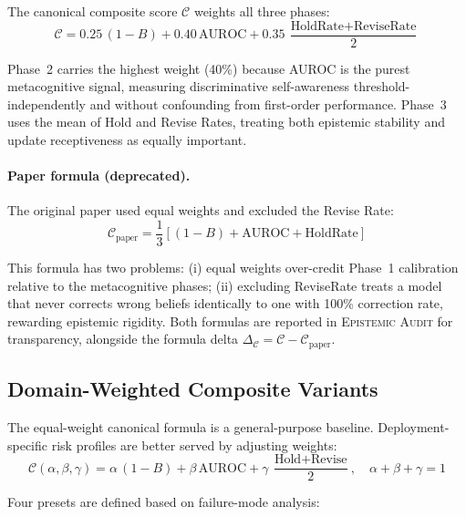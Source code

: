 \documentclass[12pt,a4paper]{article}
\newcommand{\EAv}{\textsc{Epistemic Audit}}
\begin{document}
The canonical composite score $\mathcal{C}$ weights all three phases:
\begin{equation}
    \mathcal{C} = 0.25\,(1 - B) + 0.40\,\text{AUROC} + 0.35\,\frac{\text{HoldRate} + \text{ReviseRate}}{2}
    \label{eq:composite_canonical}
\end{equation}

Phase~2 carries the highest weight (40\%) because AUROC is the purest metacognitive signal,
measuring discriminative self-awareness threshold-independently and without confounding from
first-order performance. Phase~3 uses the mean of Hold and Revise Rates, treating both
epistemic stability and update receptiveness as equally important.

\paragraph{Paper formula (deprecated).}
The original paper used equal weights and excluded the Revise Rate:
\begin{equation}
    \mathcal{C}_{\text{paper}} = \frac{1}{3}\left[(1 - B) + \text{AUROC} + \text{HoldRate}\right]
    \label{eq:composite_paper}
\end{equation}

This formula has two problems: (i) equal weights over-credit Phase~1 calibration relative
to the metacognitive phases; (ii) excluding ReviseRate treats a model that never corrects
wrong beliefs identically to one with 100\% correction rate, rewarding epistemic rigidity.
Both formulas are reported in \EAv{} for transparency, alongside the formula delta
$\Delta_{\mathcal{C}} = \mathcal{C} - \mathcal{C}_{\text{paper}}$.

\subsection{Domain-Weighted Composite Variants}
\label{sec:domainweights}

The equal-weight canonical formula is a general-purpose baseline. Deployment-specific
risk profiles are better served by adjusting weights:
\begin{equation}
    \mathcal{C}(\alpha, \beta, \gamma) = \alpha\,(1-B) + \beta\,\text{AUROC} + \gamma\,\frac{\text{Hold}+\text{Revise}}{2}, \quad \alpha+\beta+\gamma=1
    \label{eq:composite_weighted}
\end{equation}

Four presets are defined based on failure-mode analysis:
\end{document}
